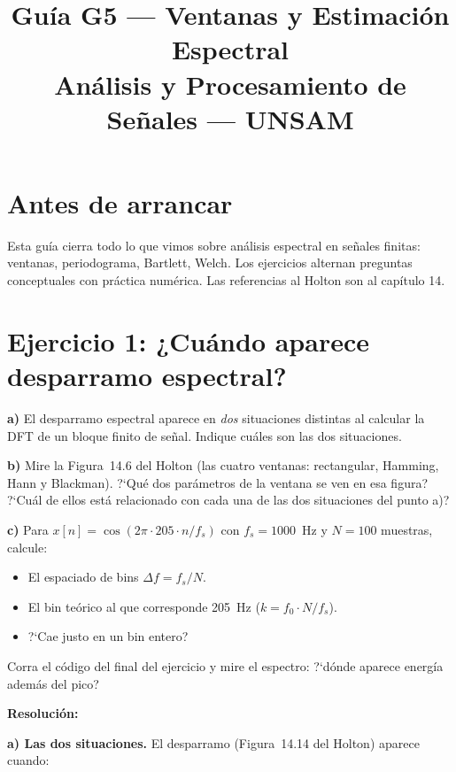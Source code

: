 \documentclass[11pt, a4paper]{article}
\title{\textbf{Gu\'ia G5 --- Ventanas y Estimaci\'on Espectral}\\[0.2cm]
       \large An\'alisis y Procesamiento de Se\~nales --- UNSAM}
\date{}
\newcommand{\res}{\smallskip\noindent\textbf{\color{enunline}Resoluci\'on:}\smallskip}
\begin{document}
\maketitle

\section*{Antes de arrancar}

Esta gu\'ia cierra todo lo que vimos sobre an\'alisis espectral en se\~nales finitas:
ventanas, periodograma, Bartlett, Welch.
Los ejercicios alternan preguntas conceptuales con pr\'actica num\'erica.
Las referencias al Holton son al cap\'itulo 14.

\section*{Ejercicio 1: ¿Cu\'ando aparece desparramo espectral?}

\begin{enun}
\textbf{a)} El desparramo espectral aparece en \emph{dos} situaciones distintas
al calcular la DFT de un bloque finito de se\~nal.
Indique cu\'ales son las dos situaciones.

\textbf{b)} Mire la Figura~14.6 del Holton (las cuatro ventanas: rectangular,
Hamming, Hann y Blackman).
?`Qu\'e dos par\'ametros de la ventana se ven en esa figura?
?`Cu\'al de ellos est\'a relacionado con cada una de las dos situaciones del punto a)?

\textbf{c)} Para $x[n] = \cos(2\pi \cdot 205 \cdot n/f_s)$ con $f_s = 1000$~Hz
y $N = 100$ muestras, calcule:
\begin{itemize}[noitemsep]
  \item El espaciado de bins $\Delta f = f_s / N$.
  \item El bin te\'orico al que corresponde 205~Hz ($k = f_0 \cdot N / f_s$).
  \item ?`Cae justo en un bin entero?
\end{itemize}
Corra el c\'odigo del final del ejercicio y mire el espectro: ?`d\'onde aparece
energ\'ia adem\'as del pico?
\end{enun}

\res

\textbf{a) Las dos situaciones.}
El desparramo (Figura~14.14 del Holton) aparece cuando:
\end{document}
